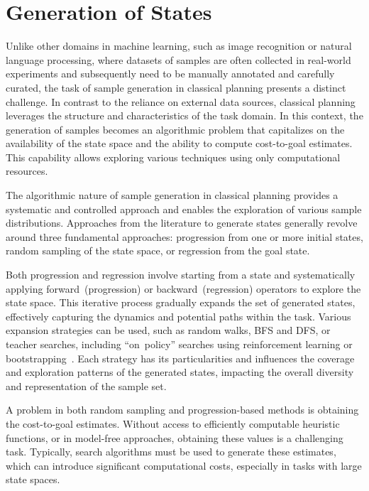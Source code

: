 \section{Generation of States}
\label{sec:state-generation}

Unlike other domains in machine learning, such as image recognition or natural language processing, where datasets of samples are often collected in real-world experiments and subsequently need to be manually annotated and carefully curated, the task of sample generation in classical planning presents a distinct challenge. In contrast to the reliance on external data sources, classical planning leverages the structure and characteristics of the task domain. In this context, the generation of samples becomes an algorithmic problem that capitalizes on the availability of the state space and the ability to compute cost-to-goal estimates. This capability allows exploring various techniques using only computational resources.

The algorithmic nature of sample generation in classical planning provides a systematic and controlled approach and enables the exploration of various sample distributions. Approaches from the literature to generate states generally revolve around three fundamental approaches: progression from one or more initial states, random sampling of the state space, or regression from the goal state.

Both progression and regression involve starting from a state and systematically applying forward~(progression) or backward~(regression) operators to explore the state space. This iterative process gradually expands the set of generated states, effectively capturing the dynamics and potential paths within the task. Various expansion strategies can be used, such as random walks, BFS and DFS, or teacher searches, including ``on~policy'' searches using reinforcement learning or bootstrapping~\cite{arfaee2011learning}. Each strategy has its particularities and influences the coverage and exploration patterns of the generated states, impacting the overall diversity and representation of the sample set.

A problem in both random sampling and progression-based methods is obtaining the cost-to-goal estimates. Without access to efficiently computable heuristic functions, or in model-free approaches, obtaining these values is a challenging task. Typically, search algorithms must be used to generate these estimates, which can introduce significant computational costs, especially in tasks with large state spaces.

